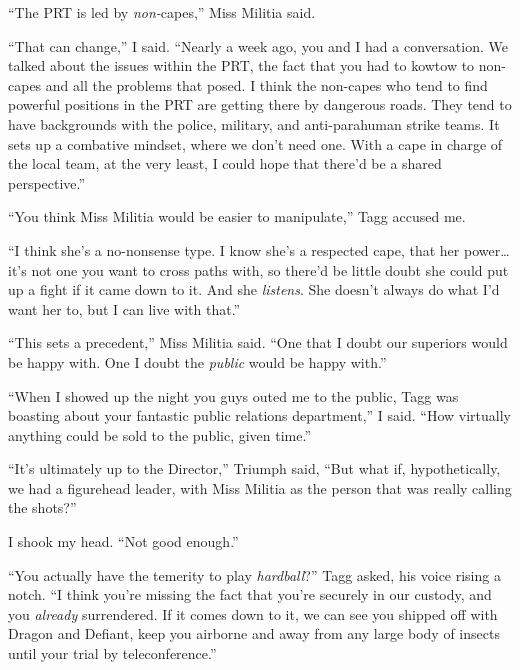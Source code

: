 ``The PRT is led by \emph{non-}capes,'' Miss Militia said.



``That can change,'' I said.  ``Nearly a week ago, you and I had a conversation.  We talked about the issues within the PRT, the fact that you had to kowtow to non-capes and all the problems that posed.  I think the non-capes who tend to find powerful positions in the PRT are getting there by dangerous roads.  They tend to have backgrounds with the police, military, and anti-parahuman strike teams.  It sets up a combative mindset, where we don't need one.  With a cape in charge of the local team, at the very least, I could hope that there'd be a shared perspective.''



``You think Miss Militia would be easier to manipulate,'' Tagg accused me.



``I think she's a no-nonsense type.  I know she's a respected cape, that her power\ldots it's not one you want to cross paths with, so there'd be little doubt she could put up a fight if it came down to it.  And she \emph{listens}.  She doesn't always do what I'd want her to, but I can live with that.''



``This sets a precedent,'' Miss Militia said.  ``One that I doubt our superiors would be happy with.  One I doubt the \emph{public} would be happy with.''



``When I showed up the night you guys outed me to the public, Tagg was boasting about your fantastic public relations department,'' I said.  ``How virtually anything could be sold to the public, given time.''



``It's ultimately up to the Director,'' Triumph said, ``But what if, hypothetically, we had a figurehead leader, with Miss Militia as the person that was really calling the shots?''



I shook my head.  ``Not good enough.''



``You actually have the temerity to play \emph{hardball}?'' Tagg asked, his voice rising a notch.  ``I think you're missing the fact that you're securely in our custody, and you \emph{already} surrendered.  If it comes down to it, we can see you shipped off with Dragon and Defiant, keep you airborne and away from any large body of insects until your trial by teleconference.''




